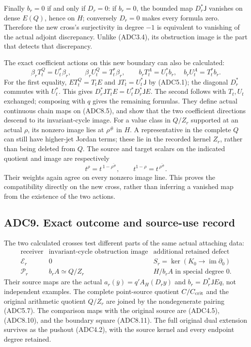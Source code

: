 Finally \(b_r=0\) if and only if \(D_r=0\): if \(b_r=0\), the bounded
map \(D_r^*\mathsf J\) vanishes on dense \(E(Q)\), hence on \(H\);
conversely \(D_r=0\) makes every formula zero. Therefore the new cross's
surjectivity in degree \(-1\) is equivalent to vanishing of the actual
adjoint discrepancy. Unlike (ADC3.4), its obstruction image is the part
that detects that discrepancy.

The exact coefficient actions on this new boundary can also be
calculated: \[
\beta_r T_t^Q=U_t^*\beta_r,\qquad
\beta_r U_t^Q=T_t^*\beta_r,\qquad
b_rT_t^A=U_t^*b_r,\quad b_rU_t^A=T_t^*b_r.
\tag{ADC8.13}
\] For the first equality, \(E T_t^Q=T_tE\) and
\(\mathsf JT_t=U_t^*\mathsf J\) by (ADC5.1); the diagonal \(D_r^*\)
commutes with \(U_t^*\). This gives
\(D_r^*\mathsf J T_tE=U_t^*D_r^*\mathsf JE\). The second follows with
\(T_t,U_t\) exchanged; composing with \(q\) gives the remaining
formulas. They define actual continuous chain maps on (ADC8.5), and show
that the two coefficient directions descend to its invariant-cycle
image. For a value class in \(Q/Z_r\) supported at an actual \(\rho\),
its nonzero image lies at \(\rho^\#\) in \(H\). A representative in the
complete \(Q\) can still have higher-jet Jordan terms; these lie in the
recorded kernel \(Z_r\), rather than being deleted from \(Q\). The
source and target scalars on the indicated quotient and image are
respectively \[
t^\rho=t^{\,1-\overline{\rho^\#}},\qquad
t^{1-\rho}=t^{\,\overline{\rho^\#}}.
\tag{ADC8.14}
\] Their weights again agree on every nonzero image line. This proves
the compatibility directly on the new cross, rather than inferring a
vanished map from the existence of the two actions.

\subsection{ADC9. Exact outcome and source-use
record}\label{adc9.-exact-outcome-and-source-use-record}

The two calculated crosses test different parts of the same actual
attaching data: \[
\begin{array}{c|c|c}
\text{receiver}&\text{invariant-cycle obstruction image}
&\text{additional retained defect}\\ \hline
\mathscr E_r&0&S_r=\ker(K_0\to\operatorname{im}\partial_0)\\
\mathscr P_r&b_rA\simeq Q/Z_r&
H/b_rA\text{ in special degree }0.
\end{array}
\tag{ADC9.1}
\] Their source maps are the actual \(a_r(\overline y)=q'A_H(D_ry)\) and
\(b_r=D_r^*\mathsf JE q\), not independent examples. The complete
point-source quotient \(C/C_{\rm crit}\) and the original arithmetic
quotient \(Q/Z_r\) are joined by the nondegenerate pairing (ADC5.7). The
comparison maps with the original source are (ADC4.5), (ADC8.10), and
the boundary square (ADC8.11). The full original dual extension survives
as the pushout (ADC4.2), with the source kernel and every endpoint
degree retained.

